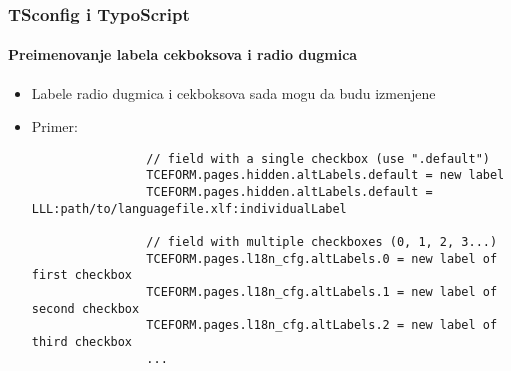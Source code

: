 
\begin{frame}[fragile]
	\frametitle{TSconfig i TypoScript}
	\framesubtitle{Preimenovanje labela cekboksova i radio dugmica}

	\lstset{basicstyle=\tiny\ttfamily}

	\begin{itemize}

		\item Labele radio dugmica i cekboksova sada mogu da budu izmenjene
		\item Primer:

			\begin{lstlisting}
				// field with a single checkbox (use ".default")
				TCEFORM.pages.hidden.altLabels.default = new label
				TCEFORM.pages.hidden.altLabels.default = LLL:path/to/languagefile.xlf:individualLabel

				// field with multiple checkboxes (0, 1, 2, 3...)
				TCEFORM.pages.l18n_cfg.altLabels.0 = new label of first checkbox
				TCEFORM.pages.l18n_cfg.altLabels.1 = new label of second checkbox
				TCEFORM.pages.l18n_cfg.altLabels.2 = new label of third checkbox
				...
			\end{lstlisting}

	\end{itemize}

\end{frame}


